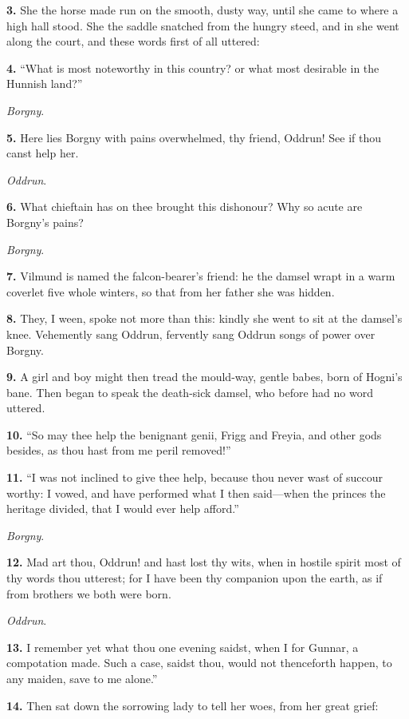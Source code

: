 \textbf{3.} She the horse made run on the smooth, dusty way, until she came
to where a high hall stood. She the saddle snatched from the hungry
steed, and in she went along the court, and these words first of all
uttered:

\textbf{4.} ``What is most noteworthy in this country? or what most desirable
in the Hunnish land?''

\emph{Borgny}.

\textbf{5.} Here lies Borgny with pains overwhelmed, thy friend, Oddrun! See
if thou canst help her.

\emph{Oddrun}.

\textbf{6.} What chieftain has on thee brought this dishonour? Why so acute
are Borgny's pains?

\emph{Borgny}.

\textbf{7.} Vilmund is named the falcon-bearer's friend: he the damsel wrapt
in a warm coverlet five whole winters, so that from her father she was
hidden.

\textbf{8.} They, I ween, spoke not more than this: kindly she went to sit at
the damsel's knee. Vehemently sang Oddrun, fervently sang Oddrun songs
of power over Borgny.

\textbf{9.} A girl and boy might then tread the mould-way, gentle babes, born
of Hogni's bane. Then began to speak the death-sick damsel, who before
had no word uttered.

\textbf{10.} ``So may thee help the benignant genii, Frigg and Freyia, and
other gods besides, as thou hast from me peril removed!''

\textbf{11.} ``I was not inclined to give thee help, because thou never wast
of succour worthy: I vowed, and have performed what I then said—when
the princes the heritage divided, that I would ever help afford.''

\emph{Borgny}.

\textbf{12.} Mad art thou, Oddrun! and hast lost thy wits, when in hostile
spirit most of thy words thou utterest; for I have been thy companion
upon the earth, as if from brothers we both were born.

\emph{Oddrun}.

\textbf{13.} I remember yet what thou one evening saidst, when I for Gunnar,
a compotation made. Such a case, saidst thou, would not thenceforth
happen, to any maiden, save to me alone.''

\textbf{14.} Then sat down the sorrowing lady to tell her woes, from her
great grief:


